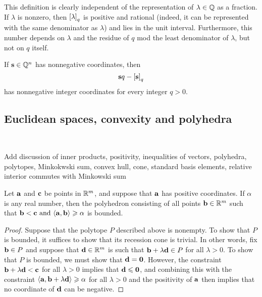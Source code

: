 \documentclass[11pt]{amsart}
\begin{document}
This definition is clearly independent of the representation of $\lambda \in \mathbb{Q}$ as a fraction.  If $\lambda$ is nonzero, then $\left[ \lambda \right]_q$ is positive and rational (indeed, it can be represented with the same denominator as $\lambda$) and lies in the unit interval.  Furthermore, this number depends on $\lambda$ and the residue of $q$ mod the least denominator of $\lambda$, but not on $q$ itself.

\begin{remark}  If $\mathbf{s} \in \mathbb{Q}^n$ has nonnegative coordinates, then \[ \mathbf{s}q - \left[ \mathbf{s} \right]_q \] has nonnegative integer coordinates for every integer $q>0$.
\end{remark}


\subsection{Euclidean spaces, convexity and polyhedra} 
\ 


 \alert[inline]{Add discussion of inner products, positivity, inequalities of vectors, polyhedra, polytopes, Minkokwski sum, convex hull, cone, standard basis elements, relative interior commutes with Minkowski sum}


\begin{lemma}  
\label{bounded polytope: L}
Let $\mathbf{a}$ and $\mathbf{c}$ be points in $\mathbb{R}^m$, and suppose that $\mathbf{a}$ has positive coordinates.    If $\alpha$ is any real number, then the polyhedron consisting of all points $\mathbf{b} \in \mathbb{R}^m$ such that  $\mathbf{b} < \mathbf{c} \text{ and } \langle \mathbf{a}, \mathbf{b} \rangle \geqslant \alpha$ is bounded.
\end{lemma}

\begin{proof}  Suppose that the polytope $P$ described above is nonempty.   To show that $P$ is bounded, it suffices to show that its recession cone is trivial.  In other words, fix $\mathbf{b} \in P$ and suppose that $\mathbf{d} \in \mathbb{R}^m$ is such that $\mathbf{b} + \lambda \mathbf{d} \in P$ for all $\lambda > 0$.  To show that $P$ is bounded, we must show that $\mathbf{d} = \mathbf{0}$.   However,  the constraint $\mathbf{b} + \lambda \mathbf{d} < \mathbf{c}$ for all $\lambda>0$ implies that $\mathbf{d} \leqslant \mathbf{0}$, and combining this with the constraint $\langle \mathbf{a}, \mathbf{b} + \lambda \mathbf{d} \rangle \geqslant \alpha$ for all $\lambda > 0$ and the positivity of $\mathbf{a}$ then implies that no coordinate of $\mathbf{d}$ can be negative.
\end{proof}
\end{document}
